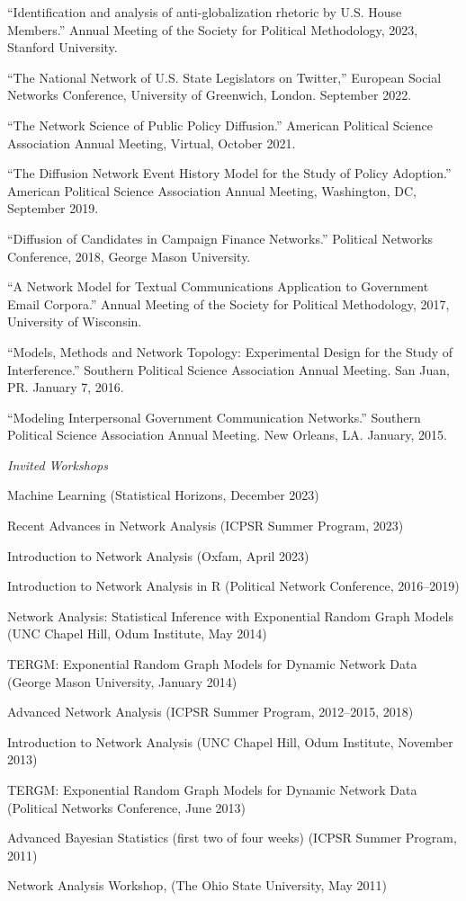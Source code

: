 \documentclass[overlapped,line]{res}
\begin{document}
\begin{resume}
\begin{etaremune}
\item ``Identification and analysis of anti-globalization rhetoric by U.S. House Members.'' Annual Meeting of the Society for Political Methodology, 2023, Stanford University.
\item ``The National Network of U.S. State Legislators on Twitter,'' European Social Networks Conference, University of Greenwich, London. September 2022. 
\item ``The Network Science of Public Policy Diffusion.'' American Political Science Association Annual Meeting, Virtual, October 2021. 
\item ``The Diffusion Network Event History Model for the Study of Policy Adoption.''  American Political Science Association Annual Meeting, Washington, DC, September 2019. 
\item ``Diffusion of Candidates in Campaign Finance Networks.'' Political Networks Conference, 2018, George Mason University.
\item ``A Network Model for Textual Communications Application to Government Email Corpora.'' Annual Meeting of the Society for Political Methodology, 2017, University of Wisconsin.
\item ``Models, Methods and Network Topology: Experimental Design for the Study of Interference.'' Southern Political Science Association Annual Meeting. San Juan, PR. January 7, 2016. 
\item ``Modeling Interpersonal Government Communication Networks.'' Southern Political Science Association Annual Meeting. New Orleans, LA. January, 2015.
\end{etaremune}

\hspace{-1cm} \emph{Invited Workshops} 
\begin{etaremune}
\item Machine Learning (Statistical Horizons, December 2023)
\item Recent Advances in Network Analysis (ICPSR Summer Program, 2023)
\item Introduction to Network Analysis (Oxfam, April 2023)
\item Introduction to Network Analysis in R (Political Network Conference, 2016--2019)
\item Network Analysis: Statistical Inference with Exponential Random Graph Models (UNC Chapel Hill, Odum Institute, May 2014)
\item TERGM: Exponential Random Graph Models for Dynamic Network Data (George Mason University, January 2014)
\item Advanced Network Analysis (ICPSR Summer Program, 2012--2015, 2018)
\item Introduction to Network Analysis (UNC Chapel Hill, Odum Institute, November 2013)
\item TERGM: Exponential Random Graph Models for Dynamic Network Data (Political Networks Conference, June 2013)
\item Advanced Bayesian Statistics (first two of four weeks) (ICPSR Summer Program, 2011)
\item Network Analysis Workshop, (The Ohio State University, May 2011)
\end{etaremune}


\end{resume}
\end{document}
